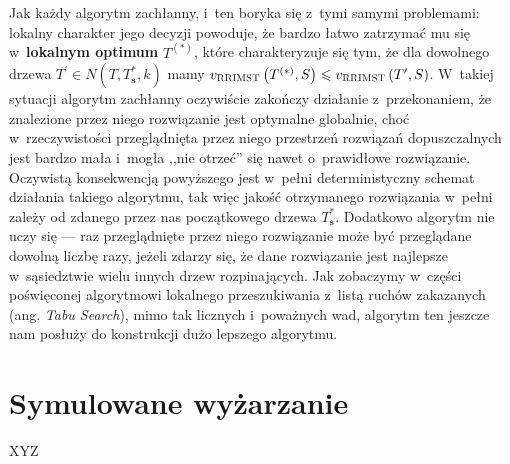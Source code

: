 Jak każdy algorytm zachłanny, i~ten boryka się z~tymi samymi problemami: lokalny charakter jego decyzji powoduje, że bardzo łatwo zatrzymać mu się w~\textbf{lokalnym optimum} $T^{\left( \ast \right)}$, które charakteryzuje się tym, że dla dowolnego drzewa $T^{\prime} \in N \left( T, T^{\ast}_{\textbf{s}}, k \right)$ mamy $v_{\textsc{RRIMST}} \left( T^{\left( \ast \right)}, S \right) \leqslant v_{\textsc{RRIMST}} \left( T^{\prime}, S \right)$. W~takiej sytuacji algorytm zachłanny oczywiście zakończy działanie z~przekonaniem, że znalezione przez niego rozwiązanie jest optymalne globalnie, choć w~rzeczywistości przeglądnięta przez niego przestrzeń rozwiązań dopuszczalnych jest bardzo mała i~mogła ,,nie otrzeć'' się nawet o~prawidłowe rozwiązanie. Oczywistą konsekwencją powyższego jest w~pełni deterministyczny schemat działania takiego algorytmu, tak więc jakość otrzymanego rozwiązania w~pełni zależy od zdanego przez nas początkowego drzewa $T^{\ast}_{\textbf{s}}$. Dodatkowo algorytm nie uczy się --- raz przeglądnięte przez niego rozwiązanie może być przeglądane dowolną liczbę razy, jeżeli zdarzy się, że dane rozwiązanie jest najlepsze w~sąsiedztwie wielu innych drzew rozpinających. Jak zobaczymy w~części poświęconej algorytmowi lokalnego przeszukiwania z~listą ruchów zakazanych (ang. \textit{Tabu Search}), mimo tak licznych i~poważnych wad, algorytm ten jeszcze nam posłuży do konstrukcji dużo lepszego algorytmu.

\section{Symulowane wyżarzanie}

XYZ

